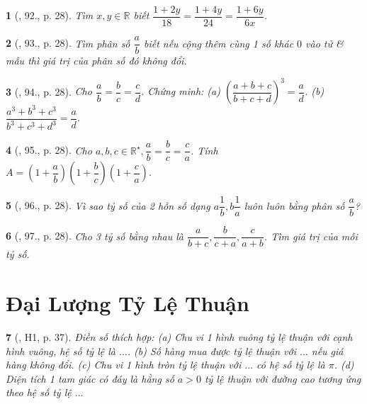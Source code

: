 \documentclass{article}
\newtheorem{baitoan}{}
\begin{document}
\begin{baitoan}[\cite{Binh_Toan_7_tap_1}, 92., p. 28]
	Tìm $x,y\in\mathbb{R}$ biết $\dfrac{1 + 2y}{18} = \dfrac{1 + 4y}{24} = \dfrac{1 + 6y}{6x}$.
\end{baitoan}

\begin{baitoan}[\cite{Binh_Toan_7_tap_1}, 93., p. 28]
	Tìm phân số $\dfrac{a}{b}$ biết nếu cộng thêm cùng 1 số khác $0$ vào tử \& mẫu thì giá trị của phân số đó không đổi.
\end{baitoan}

\begin{baitoan}[\cite{Binh_Toan_7_tap_1}, 94., p. 28]
	Cho $\dfrac{a}{b} = \dfrac{b}{c} = \dfrac{c}{d}$. Chứng minh: (a) $\left(\dfrac{a + b + c}{b + c + d}\right)^3 = \dfrac{a}{d}$. (b) $\dfrac{a^3 + b^3 + c^3}{b^3 + c^3 + d^3} = \dfrac{a}{d}$.
\end{baitoan}

\begin{baitoan}[\cite{Binh_Toan_7_tap_1}, 95., p. 28]
	Cho $a,b,c\in\mathbb{R}^\star,\dfrac{a}{b} = \dfrac{b}{c} = \dfrac{c}{a}$. Tính $A = \left(1 + \dfrac{a}{b}\right)\left(1 + \dfrac{b}{c}\right)\left(1 + \dfrac{c}{a}\right)$.
\end{baitoan}

\begin{baitoan}[\cite{Binh_Toan_7_tap_1}, 96., p. 28]
	Vì sao tỷ số của 2 hỗn số dạng $a\dfrac{1}{b},b\dfrac{1}{a}$ luôn luôn bằng phân số $\dfrac{a}{b}$?
\end{baitoan}

\begin{baitoan}[\cite{Binh_Toan_7_tap_1}, 97., p. 28]
	Cho 3 tỷ số bằng nhau là $\dfrac{a}{b + c},\dfrac{b}{c + a},\dfrac{c}{a + b}$. Tìm giá trị của mỗi tỷ số.
\end{baitoan}


\section{Đại Lượng Tỷ Lệ Thuận}

\begin{baitoan}[\cite{Binh_boi_duong_Toan_7_tap_1}, H1, p. 37]
	Điền số thích hợp: (a) Chu vi 1 hình vuông tỷ lệ thuận với cạnh hình vuông, hệ số tỷ lệ là $\ldots$. (b) Số hàng mua được tỷ lệ thuận với $\ldots$ nếu giá hàng không đổi. (c) Chu vi 1 hình tròn tỷ lệ thuận với $\ldots$ có hệ số tỷ lệ là $\pi$. (d) Diện tích 1 tam giác có đáy là hằng số $a > 0$ tỷ lệ thuận với đường cao tương ứng theo hệ số tỷ lệ $\ldots$
\end{baitoan}
\end{document}
